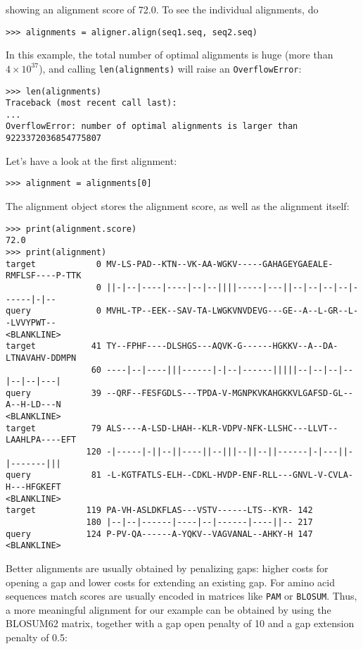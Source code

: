 showing an alignment score of 72.0. To see the individual alignments, do

\begin{verbatim}
>>> alignments = aligner.align(seq1.seq, seq2.seq)
\end{verbatim}
In this example, the total number of optimal alignments is huge (more than $4 \times 10^{37}$), and calling \verb+len(alignments)+ will raise an \verb+OverflowError+:

\begin{verbatim}
>>> len(alignments)
Traceback (most recent call last):
...
OverflowError: number of optimal alignments is larger than 9223372036854775807
\end{verbatim}
Let's have a look at the first alignment:

\begin{verbatim}
>>> alignment = alignments[0]
\end{verbatim}

The alignment object stores the alignment score, as well as the alignment
itself:

\begin{verbatim}
>>> print(alignment.score)
72.0
>>> print(alignment)
target            0 MV-LS-PAD--KTN--VK-AA-WGKV-----GAHAGEYGAEALE-RMFLSF----P-TTK
                  0 ||-|--|----|----|--|--||||-----|---||--|--|--|--|------|-|--
query             0 MVHL-TP--EEK--SAV-TA-LWGKVNVDEVG---GE--A--L-GR--L--LVVYPWT--
<BLANKLINE>
target           41 TY--FPHF----DLSHGS---AQVK-G------HGKKV--A--DA-LTNAVAHV-DDMPN
                 60 ----|--|----|||------|-|--|------|||||--|--|--|--|--|--|---|
query            39 --QRF--FESFGDLS---TPDA-V-MGNPKVKAHGKKVLGAFSD-GL--A--H-LD---N
<BLANKLINE>
target           79 ALS----A-LSD-LHAH--KLR-VDPV-NFK-LLSHC---LLVT--LAAHLPA----EFT
                120 -|-----|-||--||----||--|||--||--||------|-|---||-|-------|||
query            81 -L-KGTFATLS-ELH--CDKL-HVDP-ENF-RLL---GNVL-V-CVLA-H---HFGKEFT
<BLANKLINE>
target          119 PA-VH-ASLDKFLAS---VSTV------LTS--KYR- 142
                180 |--|--|------|----|--|------|----||-- 217
query           124 P-PV-QA------A-YQKV--VAGVANAL--AHKY-H 147
<BLANKLINE>
\end{verbatim}

Better alignments are usually obtained by penalizing gaps: higher costs
for opening a gap and lower costs for extending an existing gap. For amino
acid sequences match scores are usually encoded in matrices like \texttt{PAM}
or \texttt{BLOSUM}. Thus, a more meaningful alignment for our example can be
obtained by using the BLOSUM62 matrix, together with a gap open penalty of 10
and a gap extension penalty of 0.5:

